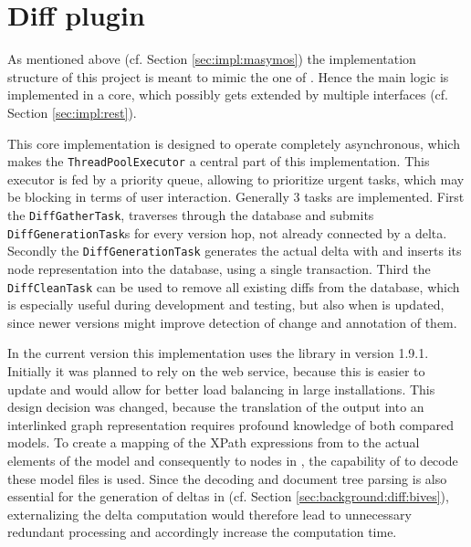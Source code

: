 	\begin{comment}
	\begin{itemize}
		\item generic ontology import for COMODI
		\item some helper methods/functions
	\end{itemize}
	\end{comment}

\section{\masymos Diff plugin}
	\label{sec:impl:diff}
	As mentioned above (cf. Section \ref{sec:impl:masymos}) the implementation structure of this project is meant to mimic the one of \masymos. Hence the main logic is implemented in a core, which possibly gets extended by multiple interfaces (cf. Section \ref{sec:impl:rest}).
	
	This core implementation is designed to operate completely asynchronous, which makes the \texttt{ThreadPoolExecutor} a central part of this implementation. This executor is fed by a priority queue, allowing to prioritize urgent tasks, which may be blocking in terms of user interaction.
	Generally 3 tasks are implemented. First the \texttt{DiffGatherTask}, traverses through the database and submits \texttt{DiffGenerationTask}s for every version hop, not already connected by a delta.
	Secondly the \texttt{DiffGenerationTask} generates the actual delta with \bives and inserts its node representation into the database, using a single transaction.
	Third the \texttt{DiffCleanTask} can be used to remove all existing diffs from the database, which is especially useful during development and testing, but also when \bives is updated, since newer versions might improve detection of  change and annotation of them.
	
	In the current version this implementation uses the \bives library in version 1.9.1. Initially it was planned to rely on the \bives web service, because this is easier to update and would allow for better load balancing in large installations.
	This design decision was changed, because the translation of the \bives \xml output into an interlinked graph representation requires profound knowledge of both compared models. To create a mapping of the XPath expressions from \bives to the actual \xml elements of the model and consequently to nodes in \masymos, the capability of \bives to decode these model files is used. Since the decoding and document tree parsing is also essential for the generation of deltas in \bives (cf. Section \ref{sec:background:diff:bives}), externalizing the delta computation would therefore lead to unnecessary redundant processing and accordingly increase the computation time.
	
